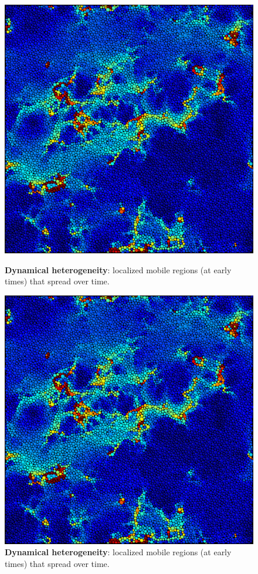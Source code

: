 \begin{frame}[c]
\begin{columns}
\begin{column}{0.5\textwidth}
\begin{figure}[t]
\begin{overprint}
\centering\includegraphics[height=0.6\textheight]{intro_glassy/softspots_280.png}
\caption{\textbf{Dynamical heterogeneity}: localized mobile regions (at early times) that spread over time.}  

\centering\includegraphics[height=0.6\textheight]{intro_glassy/softspots_280.png}
\caption{\textbf{Dynamical heterogeneity}: localized mobile regions (at early times) that spread over time.}  
\end{overprint}


\end{figure}
\end{column}
\end{columns}
\end{frame}
